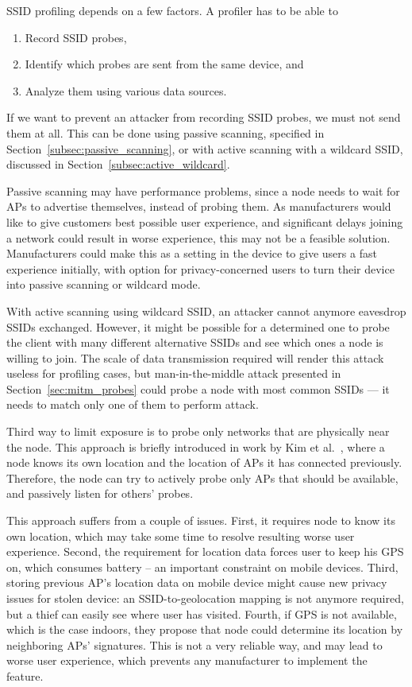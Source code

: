 \documentclass[12pt,a4paper,oneside,pdftex]{report}
\begin{document}
SSID profiling depends on a few factors. A profiler has to be able to \begin{enumerate}
    \item Record SSID probes,
    \item Identify which probes are sent from the same device, and
    \item Analyze them using various data sources.
\end{enumerate}

If we want to prevent an attacker from recording SSID probes, we must not send them at all. This can be done using passive scanning, specified in Section~\ref{subsec:passive_scanning}, or with active scanning with a wildcard SSID, discussed in Section~\ref{subsec:active_wildcard}.

Passive scanning may have performance problems, since a node needs to wait for APs to advertise themselves, instead of probing them. As manufacturers would like to give customers best possible user experience, and significant delays joining a network could result in worse experience, this may not be a feasible solution. Manufacturers could make this as a setting in the device to give users a fast experience initially, with option for privacy-concerned users to turn their device into passive scanning or wildcard mode.

With active scanning using wildcard SSID, an attacker cannot anymore eavesdrop SSIDs exchanged. However, it might be possible for a determined one to probe the client with many different alternative SSIDs and see which ones a node is willing to join. The scale of data transmission required will render this attack useless for profiling cases, but man-in-the-middle attack presented in Section~\ref{sec:mitm_probes} could probe a node with most common SSIDs --- it needs to match only one of them to perform attack.

Third way to limit exposure is to probe only networks that are physically near the node. This approach is briefly introduced in work by Kim et al.~\cite{kimposter}, where a node knows its own location and the location of APs it has connected previously. Therefore, the node can try to actively probe only APs that should be available, and passively listen for others' probes. 

This approach suffers from a couple of issues. First, it requires node to know its own location, which may take some time to resolve resulting worse user experience. Second, the requirement for location data forces user to keep his GPS on, which consumes battery -- an important constraint on mobile devices. Third, storing previous AP's location data on mobile device might cause new privacy issues for stolen device: an SSID-to-geolocation mapping is not anymore required, but a thief can easily see where user has visited. Fourth, if GPS is not available, which is the case indoors, they propose that node could determine its location by neighboring APs' signatures. This is not a very reliable way, and may lead to worse user experience, which prevents any manufacturer to implement the feature.
\end{document}
